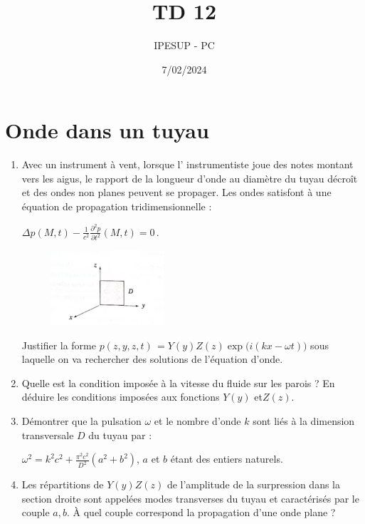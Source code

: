 \documentclass{article}
\title{TD 12}
\author{IPESUP - PC }
\date{7/02/2024}
\begin{document}
\maketitle



\section{Onde dans un tuyau}




\begin{enumerate}
  \item 
  Avec un instrument à vent, lorsque l' instrumentiste joue des notes montant vers les aigus, le
  rapport de la longueur d'onde au diamètre du tuyau décroît et des ondes non planes peuvent
  se propager. Les ondes satisfont à une équation de propagation tridimensionnelle :
  
  $\Delta p(M,t)-{\frac{1}{c^{2}}}{\frac{\partial^{2}p}{\partial t^{2}}}(M,t)=0\,.$
  
  
  \begin{figure}[h]
    \centering
    \includegraphics[width=0.4\textwidth]{tuyau_schéma.png}
    \label{fig:maison}
      \caption{}
  \end{figure}
    Justifier la forme ${{{p(z,y,z,t)}}}\,=Y(y)Z(z){\exp}{{\big(}i(k x-\omega t){\big)}}$ sous laquelle on va rechercher des
  solutions de l’équation d’onde.
  \item Quelle est la condition imposée à la vitesse du fluide sur les parois ? En déduire les conditions
  imposées aux fonctions $Y(y)$ et$ Z(z)$.

  \item Démontrer que la pulsation $\omega$ et le nombre d'onde $k$ sont liés à la dimension transversale
  $D$ du tuyau par :

  $\omega^{2}=k^{2}c^{2}+{\frac{\pi^{2}c^{2}}{D^{2}}}\left(a^{2}+b^{2}\right)$, $a$ et $b$ étant des entiers naturels.
  \item Les répartitions de $Y(y)Z(z)$ de l'amplitude de la surpression dans la section droite sont
  appelées modes transverses du tuyau et caractérisés par le couple ${a,b}$. À quel couple correspond la propagation d’une onde plane ?






\end{enumerate}
\end{document}

